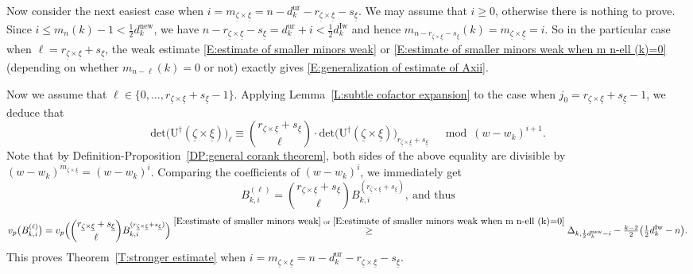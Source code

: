 \documentclass[12pt]{amsart}
\theoremstyle{definition}
\numberwithin{equation}{subsection}
\def\rmU{\mathrm{U}}
\newcommand{\new}{\mathrm{new}}
\newcommand{\Iw}{\mathrm{Iw}}
\renewcommand{\det}{\mathrm{det}}
\newcommand{\ur}{\mathrm{ur}}
\begin{document}
Now consider the next easiest case when $i  = m_{\underline \zeta \times \underline \xi}= n-d_k^\ur - r_{\underline \zeta \times \underline \xi} -s_{\underline \xi}$.  We may assume that $i\geq 0$, otherwise there is nothing to prove. Since $i\leq m_n(k)-1<\tfrac 12 d_k^\new$, we have $n-r_{\underline \zeta \times \underline \xi}-s_{\underline \xi}=d_k^\ur+i<\tfrac 12 d_k^\Iw$ and hence $m_{n-r_{\underline \zeta \times \underline \xi}-s_{\underline \xi}}(k) = m_{\underline \zeta \times \underline \xi} = i$.  
So in the particular case when $\ell = r_{\underline \zeta \times \underline \xi} + s_{\underline \xi}$, the weak estimate \eqref{E:estimate of smaller minors weak} or \eqref{E:estimate of smaller minors weak when m n-ell (k)=0} (depending on whether $m_{n-\ell}(k)=0$ or not) exactly gives \eqref{E:generalization of estimate of Axii}. 

Now we assume that $\ell \in \{0, \dots, r_{\underline \zeta \times \underline \xi}+s_{\underline \xi}-1\}$.
Applying Lemma~\ref{L:subtle cofactor expansion} to the case when $j_0 = r_{\underline \zeta \times \underline \xi}+s_{\underline \xi}-1$, we deduce that
$$
\det\big(\rmU^\dagger(\underline \zeta \times \underline \xi)\big)_\ell  \equiv \binom{r_{\underline \zeta \times \underline \xi}+s_{\underline \xi}}{\ell} \cdot \det\big(\rmU^\dagger(\underline \zeta \times \underline \xi)\big)_{r_{\underline \zeta \times \underline \xi}+ s_{\underline \xi}} \quad \bmod (w-w_k)^{i+1}.
$$
Note that by Definition-Proposition~\ref{DP:general corank theorem}, both sides of the above equality are divisible by $(w-w_k)^{m_{\underline\zeta\times \underline \xi}}=(w-w_k)^i$.
Comparing the coefficients of $(w-w_k)^{i}$, we immediately get
\begin{equation}
\label{E:Bkiell = Bkir+s}
B_{k,i}^{(\ell)} =\binom{r_{\underline \zeta \times \underline \xi}+s_{\underline \xi}}{\ell} B_{k, i}^{( r_{\underline \zeta \times \underline \xi}+s_{\underline \xi})}, \ \textrm{and thus}
\end{equation}
$$
v_p\big(B_{k,i}^{(\ell)} \big) =v_p \Big( \binom{r_{\underline \zeta \times \underline \xi}+s_{\underline \xi}}{\ell} B_{k, i}^{( r_{\underline \zeta \times \underline \xi}+s_{\underline \xi})} \Big) \stackrel{\eqref{E:estimate of smaller minors weak} \textrm{ or }\eqref{E:estimate of smaller minors weak when m n-ell (k)=0}} \geq  \Delta_{k, \frac 12d_k^\new -i} - \tfrac{k-2}2\big( \tfrac 12d_k^\Iw - n\big).
$$
This proves Theorem~\ref{T:stronger estimate} when $i  = m_{\underline \zeta \times \underline \xi}= n-d_k^\ur - r_{\underline \zeta \times \underline \xi} -s_{\underline \xi}$.
 
\end{document}
